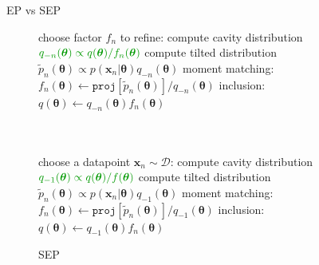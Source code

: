\documentclass[mathserif]{beamer}
\begin{document}
\begin{frame}{EP vs SEP}

\begin{figure}[!t]
\begin{minipage}[t]{0.45\linewidth}
\centering
\begin{algorithm}[H]
\renewcommand{\thealgorithm}{} 
\caption{EP} \small
\label{alg:ep} 
\begin{algorithmic}[1] 
	\STATE \small choose factor $f_n$ to refine:
	\STATE compute cavity distribution \\ $\color{dkgreen}q_{-n}(\bm{\theta}) \propto q(\bm{\theta}) / f_n(\bm{\theta})$ 
	\STATE compute tilted distribution \\$\tilde{p}_n(\bm{\theta}) \propto p(\bm{x}_n|\bm{\theta}) q_{-n}(\bm{\theta})$
	\STATE moment matching: \\ \hspace{-1mm}$f_n(\bm{\theta}) \leftarrow \mathtt{proj}[\tilde{p}_n(\bm{\theta})] / q_{-n}(\bm{\theta}) $
	\STATE inclusion:\\ $q(\bm{\theta}) \leftarrow q_{-n}(\bm{\theta}) f_n(\bm{\theta})$\\\hspace{1mm}\\ \vspace{1.5mm} \hspace{1mm}\\
\end{algorithmic}
\end{algorithm}
\end{minipage}
\begin{minipage}[t]{0.45\linewidth}
\centering
\begin{algorithm}[H]
\renewcommand{\thealgorithm}{}
\caption{SEP} \small
\label{alg:sep} 
\begin{algorithmic}[1] 
	\STATE \small choose a datapoint $\bm{x}_n\sim \mathcal{D}$:
	\STATE compute cavity distribution \\ $\color{dkgreen}q_{-1}(\bm{\theta}) \propto q(\bm{\theta}) / f(\bm{\theta})$
	\STATE compute tilted distribution \\$\tilde{p}_n(\bm{\theta}) \propto p(\bm{x}_n|\bm{\theta}) q_{-1}(\bm{\theta})$
	\STATE moment matching: \\\hspace{-1mm}$f_n(\bm{\theta}) \leftarrow \mathtt{proj}[\tilde{p}_n(\bm{\theta})] / q_{-1}(\bm{\theta}) $
	\STATE inclusion:\\ $q(\bm{\theta}) \leftarrow q_{-1}(\bm{\theta}) f_n(\bm{\theta})$
\end{algorithmic}
\end{algorithm}
\end{minipage} 
\end{figure}
\end{frame}
\end{document}
